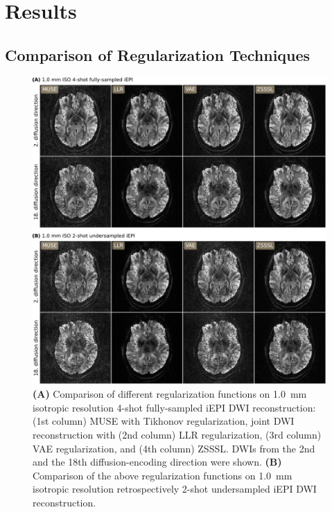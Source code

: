 \documentclass[journal,twoside,web]{ieeecolor}
\begin{document}
	\section{Results}

	\subsection{Comparison of Regularization Techniques}

	\begin{figure}
		\centering
		\includegraphics[width=\textwidth]{../figures/fig2.png}
		\caption{\textbf{(A)} Comparison of different regularization functions
			on \SI{1.0}{mm} isotropic resolution 4-shot fully-sampled iEPI DWI reconstruction:
			(1st column) MUSE with Tikhonov regularization,
			joint DWI reconstruction with
			(2nd column) LLR regularization,
			(3rd column) VAE regularization, and
			(4th column) ZSSSL.
			DWIs from the 2nd and the 18th diffusion-encoding direction were shown.
			\textbf{(B)} Comparison of the above regularization functions
			on \SI{1.0}{mm} isotropic resolution
			retrospectively 2-shot undersampled iEPI DWI reconstruction.
		}
		\label{FIG:REGU}
	\end{figure}
\end{document}
